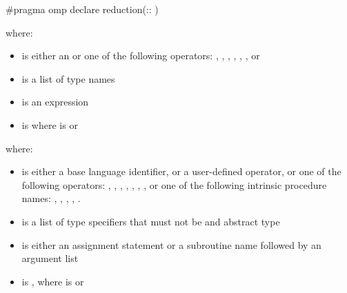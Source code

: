 \begin{cppspecific}
\begin{ompcPragma}
#pragma omp declare reduction(::
)
\end{ompcPragma}

where:

\begin{itemize}
\item {} is either an  or one of 
      the following operators: \code{+}, \code{-}, \code{*}, \code{&}, \code{|},
      \code{^}, \code{&&} or \code{||}
\item {} is a list of type names
\item {} is an expression

\item {} is \code{)}
      where  is\linebreak 
        or \code{(}\code{)}
\end{itemize}
\end{cppspecific}


\begin{fortranspecific}

where:

\begin{itemize}
\item {} is either a base language identifier, or a 
      user-defined operator, or one of the following operators: \code{+}, \code{-},
      \code{*}, , , , , or one of 
      the following intrinsic procedure names: , , ,
      , .
\item {} is a list of type specifiers that must not be  
      and abstract type
\item {} is either an assignment statement or a subroutine name followed 
      by an argument list
\item {} is \code{)},
      where  is\linebreak
       or \code{(}\code{)}
\end{itemize}
\end{fortranspecific}

